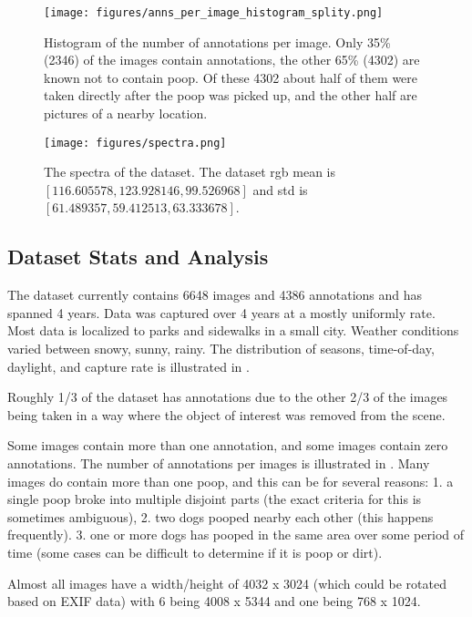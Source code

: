 \documentclass[10pt,twocolumn,letterpaper]{article}
\begin{document}
\begin{figure}[h]
\centering
\texttt{[image: figures/anns\_per\_image\_histogram\_splity.png]}
\caption[]{
    Histogram of the number of annotations per image. 
    Only 35\% (2346) of the images contain annotations, the other 65\% (4302)
    are known not to contain poop. Of these 4302 about half of them were taken
    directly after the poop was picked up, and the other half are pictures of a
    nearby location.
}
\label{fig:AnnotsPerImage}
\end{figure}


\begin{figure}[h]
\centering
\texttt{[image: figures/spectra.png]}
\caption[]{
    The spectra of the dataset.
    The dataset rgb  mean is $[116.605578, 123.928146, 99.526968]$ and std is
    $[61.489357, 59.412513, 63.333678]$.
}
\label{fig:spectra}
\end{figure}

\subsection{Dataset Stats and Analysis}


The dataset currently contains 6648 images and 4386 annotations and has spanned
4 years. Data was captured over 4 years at a mostly uniformly rate.  Most data
is localized to parks and sidewalks in a small city.  Weather conditions varied
between snowy, sunny, rainy.  The distribution of seasons, time-of-day,
daylight, and capture rate is illustrated in .

Roughly 1/3 of the dataset has annotations due to the other 2/3 of the
images being taken in a way where the object of interest was removed from the
scene.

Some images contain more than one annotation, and some images contain zero annotations.
The number of annotations per images is illustrated in .
Many images do contain more than one poop, and this can be for several reasons:
    1. a single poop broke into multiple disjoint parts (the exact criteria for this is sometimes ambiguous), 
    2. two dogs pooped nearby each other (this happens frequently). 
    3. one or more dogs has pooped in the same area over some period of
       time (some cases can be difficult to determine if it is poop or dirt).

Almost all images have a width/height of 4032 x 3024 (which could be rotated
based on EXIF data) with 6 being 4008 x 5344 and one being 768 x 1024.
\end{document}
